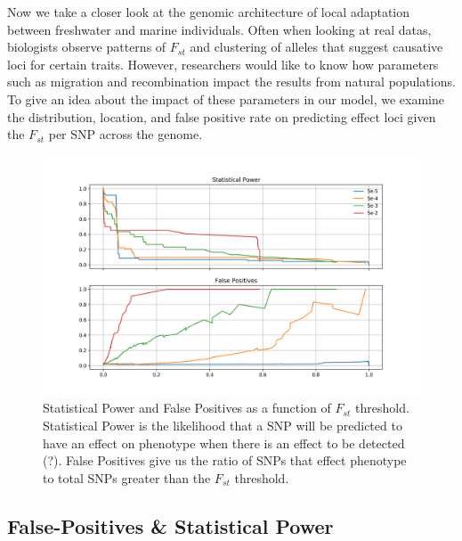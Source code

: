 \documentclass{article}
\newcommand{\plr}[1]{\todo[linecolor=blue,backgroundcolor=blue!25,bordercolor=blue]{#1}}
\begin{document}
Now we take a closer look at the genomic architecture of local adaptation between freshwater and marine individuals. 
Often when looking at real datas, biologists observe patterns of $F_{st}$ and clustering of alleles that suggest causative loci for certain traits.
However, researchers would like to know how parameters such as migration and recombination impact the results from natural populations.
To give an idea about the impact of these parameters in our model, we examine the distribution, location, and false positive rate on predicting effect loci
given the $F_{st}$ per SNP across the genome. 


\begin{figure}
	\begin{center}
  		\includegraphics[width=0.7\linewidth]{matplotlibPlots/Power_FP.png}
  		\caption{ 
		Statistical Power and False Positives as a function of $F_{st}$ threshold. 
		Statistical Power is the likelihood that a SNP will be predicted to have an effect on phenotype when there is an effect to be detected (?).
		False Positives give us the ratio of SNPs that effect phenotype to total SNPs greater than the $F_{st}$ threshold.
		}
  		\label{fig:Power_FP}
	\end{center}
\end{figure}


\subsection*{False-Positives \& Statistical Power}

\end{document}
